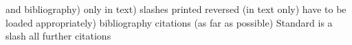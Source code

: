 and bibliography)
only in text)
slashes
printed reversed (in text only)
have to be loaded appropriately)
bibliography
citations (as far as possible)
Standard is a slash
all further citations
